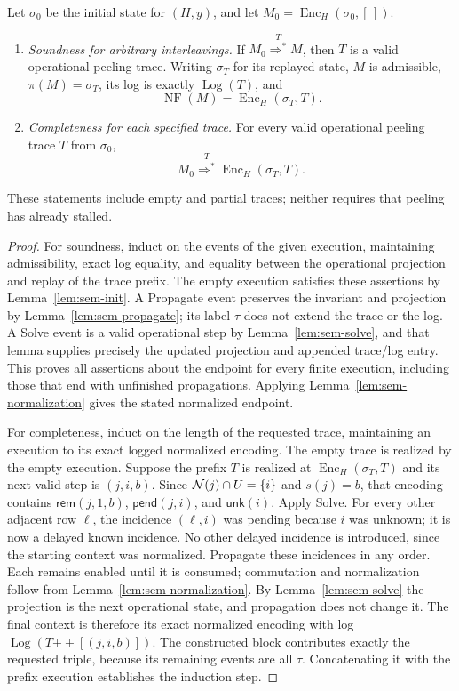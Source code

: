 \begin{thm}
\label{thm:sem-adequacy}
Let $\sigma_0$ be the initial state for $(H,y)$, and let
$M_0=\operatorname{Enc}_H(\sigma_0,[\,])$.
\begin{enumerate}
\item \emph{Soundness for arbitrary interleavings.}
If $M_0\overset{T}{\Longrightarrow^{*}}M$, then $T$ is a valid operational
peeling trace. Writing $\sigma_T$ for its replayed state, $M$ is admissible,
$\pi(M)=\sigma_T$, its log is exactly $\operatorname{Log}(T)$, and
\[
 \operatorname{NF}(M)=\operatorname{Enc}_H(\sigma_T,T).
\]
\item \emph{Completeness for each specified trace.}
For every valid operational peeling trace $T$ from $\sigma_0$,
\[
 M_0\overset{T}{\Longrightarrow^{*}}
       \operatorname{Enc}_H(\sigma_T,T).
\]
\end{enumerate}
These statements include empty and partial traces; neither requires that
peeling has already stalled.
\end{thm}
\begin{proof}
For soundness, induct on the events of the given execution, maintaining
admissibility, exact log equality, and equality between the operational
projection and replay of the trace prefix. The empty execution satisfies
these assertions by Lemma~\ref{lem:sem-init}. A Propagate event preserves
the invariant and projection by Lemma~\ref{lem:sem-propagate}; its label
$\tau$ does not extend the trace or the log. A Solve event is a valid
operational step by Lemma~\ref{lem:sem-solve}, and that lemma supplies
precisely the updated projection and appended trace/log entry. This proves
all assertions about the endpoint for every finite execution, including
those that end with unfinished propagations. Applying
Lemma~\ref{lem:sem-normalization} gives the stated normalized endpoint.

For completeness, induct on the length of the requested trace, maintaining
an execution to its exact logged normalized encoding. The empty trace is
realized by the empty execution. Suppose the prefix $T$ is realized at
$\operatorname{Enc}_H(\sigma_T,T)$ and its next valid step is $(j,i,b)$.
Since $\mathcal{N}(j)\cap U=\{i\}$ and $s(j)=b$, that encoding contains
$\mathsf{rem}(j,1,b)$, $\mathsf{pend}(j,i)$, and $\mathsf{unk}(i)$.
Apply Solve. For every other adjacent row $\ell$, the incidence $(\ell,i)$
was pending because $i$ was unknown; it is now a delayed known incidence.
No other delayed incidence is introduced, since the starting context was
normalized. Propagate these incidences in any order. Each remains enabled
until it is consumed; commutation and normalization follow from
Lemma~\ref{lem:sem-normalization}. By Lemma~\ref{lem:sem-solve} the projection
is the next operational state, and propagation does not change it.
The final context is therefore its exact normalized encoding with log
$\operatorname{Log}(T\mathbin{+\!+}[(j,i,b)])$.
The constructed block contributes exactly the requested triple, because
its remaining events are all $\tau$. Concatenating it with the prefix
execution establishes the induction step.
\end{proof}

